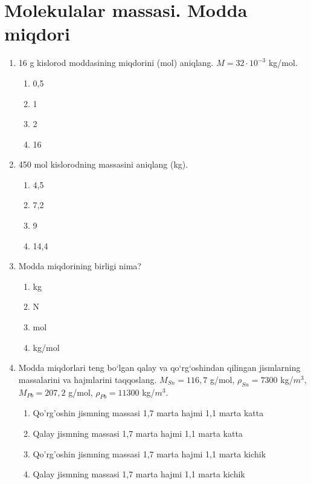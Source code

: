 \section{Molekulalar massasi. Modda miqdori}


\begin{enumerate}

\item 16 g kislorod moddasining miqdorini (mol) aniqlang. $M = 32 \cdot 10^{-3}$ kg/mol.
\begin{enumerate}[label=\Alph*)]
\item 0,5
\item 1
\item 2
\item 16
\end{enumerate}

\item 450 mol kislorodning massasini aniqlang (kg).
\begin{enumerate}[label=\Alph*)]
\item 4,5
\item 7,2
\item 9
\item 14,4
\end{enumerate}

\item Modda miqdorining birligi nima?
\begin{enumerate}[label=\Alph*)]
\item kg
\item N
\item mol
\item kg/mol
\end{enumerate}

\item Modda miqdorlari teng bo‘lgan qalay va qo‘rg‘oshindan qilingan jismlarning massalarini va hajmlarini taqqoslang. $M_{Sn} = 116,7$ g/mol, $\rho_{Sn} = 7300$ kg/$m^3$, $M_{Pb} = 207,2$ g/mol, $\rho_{Pb} = 11300$ kg/$m^3$.
\begin{enumerate}[label=\Alph*)]
\item Qo'rg'oshin jismning massasi 1,7 marta hajmi 1,1 marta katta
\item Qalay jismning massasi 1,7 marta hajmi 1,1 marta katta
\item Qo'rg'oshin jismning massasi 1,7 marta hajmi 1,1 marta kichik
\item Qalay jismning massasi 1,7 marta hajmi 1,1 marta kichik
\end{enumerate}


\end{enumerate}
